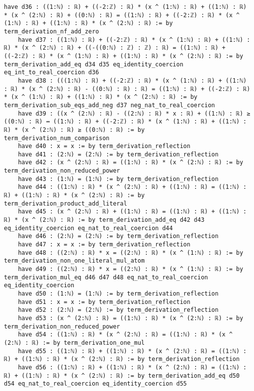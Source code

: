 \documentclass{article}
\begin{document}
\begin{tcolorbox}[colback=white!10, width=\linewidth]
\begin{lstlisting}[language=Lean4]
    have d36 : ((1:ℕ) : ℝ) + ((-2:ℤ) : ℝ) * (x ^ (1:ℕ) : ℝ) + ((1:ℕ) : ℝ) * (x ^ (2:ℕ) : ℝ) + ((0:ℕ) : ℝ) = ((1:ℕ) : ℝ) + ((-2:ℤ) : ℝ) * (x ^ (1:ℕ) : ℝ) + ((1:ℕ) : ℝ) * (x ^ (2:ℕ) : ℝ) := by term_derivation_nf_add_zero
    have d37 : ((1:ℕ) : ℝ) + ((-2:ℤ) : ℝ) * (x ^ (1:ℕ) : ℝ) + ((1:ℕ) : ℝ) * (x ^ (2:ℕ) : ℝ) + ((-((0:ℕ) : ℤ) : ℤ) : ℝ) = ((1:ℕ) : ℝ) + ((-2:ℤ) : ℝ) * (x ^ (1:ℕ) : ℝ) + ((1:ℕ) : ℝ) * (x ^ (2:ℕ) : ℝ) := by term_derivation_add_eq d34 d35 eq_identity_coercion eq_int_to_real_coercion d36
    have d38 : (((1:ℕ) : ℝ) + ((-2:ℤ) : ℝ) * (x ^ (1:ℕ) : ℝ) + ((1:ℕ) : ℝ) * (x ^ (2:ℕ) : ℝ) - ((0:ℕ) : ℝ) : ℝ) = ((1:ℕ) : ℝ) + ((-2:ℤ) : ℝ) * (x ^ (1:ℕ) : ℝ) + ((1:ℕ) : ℝ) * (x ^ (2:ℕ) : ℝ) := by term_derivation_sub_eqs_add_neg d37 neg_nat_to_real_coercion
    have d39 : ((x ^ (2:ℕ) : ℝ) - ((2:ℕ) : ℝ) * x : ℝ) + ((1:ℕ) : ℝ) ≥ ((0:ℕ) : ℝ) ↔ ((1:ℕ) : ℝ) + ((-2:ℤ) : ℝ) * (x ^ (1:ℕ) : ℝ) + ((1:ℕ) : ℝ) * (x ^ (2:ℕ) : ℝ) ≥ ((0:ℕ) : ℝ) := by term_derivation_num_comparison
    have d40 : x = x := by term_derivation_reflection
    have d41 : (2:ℕ) = (2:ℕ) := by term_derivation_reflection
    have d42 : (x ^ (2:ℕ) : ℝ) = ((1:ℕ) : ℝ) * (x ^ (2:ℕ) : ℝ) := by term_derivation_non_reduced_power
    have d43 : (1:ℕ) = (1:ℕ) := by term_derivation_reflection
    have d44 : ((1:ℕ) : ℝ) * (x ^ (2:ℕ) : ℝ) + ((1:ℕ) : ℝ) = ((1:ℕ) : ℝ) + ((1:ℕ) : ℝ) * (x ^ (2:ℕ) : ℝ) := by term_derivation_product_add_literal
    have d45 : (x ^ (2:ℕ) : ℝ) + ((1:ℕ) : ℝ) = ((1:ℕ) : ℝ) + ((1:ℕ) : ℝ) * (x ^ (2:ℕ) : ℝ) := by term_derivation_add_eq d42 d43 eq_identity_coercion eq_nat_to_real_coercion d44
    have d46 : (2:ℕ) = (2:ℕ) := by term_derivation_reflection
    have d47 : x = x := by term_derivation_reflection
    have d48 : ((2:ℕ) : ℝ) * x = ((2:ℕ) : ℝ) * (x ^ (1:ℕ) : ℝ) := by term_derivation_non_one_literal_mul_atom
    have d49 : ((2:ℕ) : ℝ) * x = ((2:ℕ) : ℝ) * (x ^ (1:ℕ) : ℝ) := by term_derivation_mul_eq d46 d47 d48 eq_nat_to_real_coercion eq_identity_coercion
    have d50 : (1:ℕ) = (1:ℕ) := by term_derivation_reflection
    have d51 : x = x := by term_derivation_reflection
    have d52 : (2:ℕ) = (2:ℕ) := by term_derivation_reflection
    have d53 : (x ^ (2:ℕ) : ℝ) = ((1:ℕ) : ℝ) * (x ^ (2:ℕ) : ℝ) := by term_derivation_non_reduced_power
    have d54 : ((1:ℕ) : ℝ) * (x ^ (2:ℕ) : ℝ) = ((1:ℕ) : ℝ) * (x ^ (2:ℕ) : ℝ) := by term_derivation_one_mul
    have d55 : ((1:ℕ) : ℝ) + ((1:ℕ) : ℝ) * (x ^ (2:ℕ) : ℝ) = ((1:ℕ) : ℝ) + ((1:ℕ) : ℝ) * (x ^ (2:ℕ) : ℝ) := by term_derivation_reflection
    have d56 : ((1:ℕ) : ℝ) + ((1:ℕ) : ℝ) * (x ^ (2:ℕ) : ℝ) = ((1:ℕ) : ℝ) + ((1:ℕ) : ℝ) * (x ^ (2:ℕ) : ℝ) := by term_derivation_add_eq d50 d54 eq_nat_to_real_coercion eq_identity_coercion d55

\end{lstlisting}
\end{tcolorbox}
\end{document}
